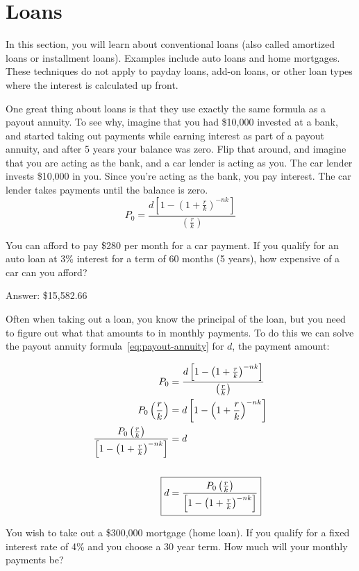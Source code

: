 \newpage

\section{Loans}%
\label{sec:loans}

In this section, you will learn about conventional loans (also called
amortized loans or installment loans). Examples include auto loans and
home mortgages. These techniques do not apply to payday loans, add-on
loans, or other loan types where the interest is calculated up front.

One great thing about loans is that they use exactly the same formula
as a payout annuity. To see why, imagine that you had \$10,000
invested at a bank, and started taking out payments while earning
interest as part of a payout annuity, and after 5 years your balance
was zero. Flip that around, and imagine that you are acting as the
bank, and a car lender is acting as you. The car lender invests
\$10,000 in you. Since you're acting as the bank, you pay interest.
The car lender takes payments until the balance is zero.
\[
  \boxed{P_{0}
    = \frac{d\left[ {1 - \left( 1+\frac{r}{k} \right)}^{-nk} \right]}
    {\left( \frac{r}{k} \right)}}
\]
\begin{exercise}
  You can afford to pay \$280 per month for a car payment. If you
  qualify for an auto loan at 3\% interest for a term of 60 months (5
  years), how expensive of a car can you afford?

\end{exercise}

\noindent Answer: \$15,582.66

\newpage

Often when taking out a loan, you know the principal of the loan, but
you need to figure out what that amounts to in monthly payments. To do
this we can solve the payout annuity formula~\eqref{eq:payout-annuity}
for \(d\), the payment amount:

\begin{align*}
  P_{0}
  &= \frac{d\left[ {1 - \left( 1+\frac{r}{k} \right)}^{-nk} \right]}
    {\left( \frac{r}{k} \right)} \\
  P_{0}\left( \frac{r}{k} \right)
  &= d\left[ {1 - \left( 1+\frac{r}{k} \right)}^{-nk} \right] \\
  \frac{P_{0}\left( \frac{r}{k} \right)}
  {\left[ {1 - \left( 1+\frac{r}{k} \right)}^{-nk} \right]}
  &= d \\ \\
  \Aboxed{
  d &=
      \frac{P_{0}\left( \frac{r}{k} \right)}
      {\left[ {1 - \left( 1+\frac{r}{k} \right)}^{-nk} \right]}
  }
\end{align*}
\begin{exercise}
  You wish to take out a \$300,000 mortgage (home loan). If you
  qualify for a fixed interest rate of 4\% and you choose a 30 year
  term. How much will your monthly payments be?

\end{exercise}

